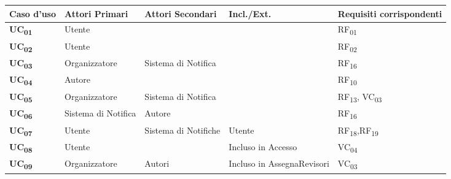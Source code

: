 \begin{tabular}{|p{2cm}|p{2cm}|p{2cm}|p{2cm}|p{2cm}|}
  \hline
  \rowcolor{SkyBlue}
  Caso d'uso & Attori Primari & Attori Secondari & Incl./Ext. & Requisiti corrispondenti \\
  \hline
  \hline
  \textbf{UC\textsubscript{01}}& Utente & & & RF\textsubscript{01} \\
  \hline
  \textbf{UC\textsubscript{02}} & Utente & & & RF\textsubscript{02} \\
  \hline
  \textbf{UC\textsubscript{03}} & Organizzatore & Sistema di Notifica & & RF\textsubscript{16} \\
  \hline
  \textbf{UC\textsubscript{04}} & Autore & & & RF\textsubscript{10} \\
  \hline
  \textbf{UC\textsubscript{05}} & Organizzatore & Sistema di Notifica&  & RF\textsubscript{13}, VC\textsubscript{03} \\
  \hline
  \textbf{UC\textsubscript{06}} & Sistema di Notifica & Autore & & RF\textsubscript{16}\\
  \hline
 \textbf{UC\textsubscript{07}} & Utente &  Sistema di Notifiche & Utente & RF\textsubscript{18},RF\textsubscript{19}\\
  \hline
 \textbf{UC\textsubscript{08}} & Utente &  & Incluso in Accesso& VC\textsubscript{04}\\
  \hline
  \textbf{UC\textsubscript{09}} & Organizzatore & Autori & Incluso in AssegnaRevisori & VC\textsubscript{03} \\
  \hline
\end{tabular}
